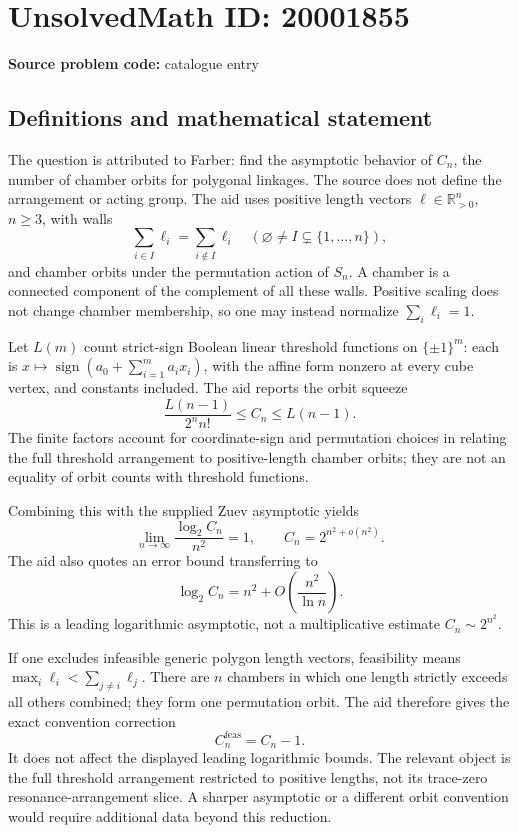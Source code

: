 \documentclass[11pt]{article}
\newcommand{\R}{\mathbb{R}}
\begin{document}
\section*{UnsolvedMath ID: 20001855}
\textbf{Source problem code:} catalogue entry
\subsection{Definitions and mathematical statement}
The question is attributed to Farber: find the asymptotic behavior of \(C_n\), the number of chamber orbits for polygonal linkages. The source does not define the arrangement or acting group. The aid uses positive length vectors \(\ell\in\R_{>0}^n\), \(n\geq3\), with walls
\[
 \sum_{i\in I}\ell_i=\sum_{i\notin I}\ell_i
 \quad(\varnothing\ne I\subsetneq\{1,\ldots,n\}),
\]
and chamber orbits under the permutation action of \(S_n\). A chamber is a connected component of the complement of all these walls. Positive scaling does not change chamber membership, so one may instead normalize \(\sum_i\ell_i=1\).

Let \(L(m)\) count strict-sign Boolean linear threshold functions on \(\{\pm1\}^m\): each is \(x\mapsto\operatorname{sign}(a_0+\sum_{i=1}^m a_ix_i)\), with the affine form nonzero at every cube vertex, and constants included. The aid reports the orbit squeeze
\[
 \frac{L(n-1)}{2^n n!}\leq C_n\leq L(n-1).
\]
The finite factors account for coordinate-sign and permutation choices in relating the full threshold arrangement to positive-length chamber orbits; they are not an equality of orbit counts with threshold functions.

Combining this with the supplied Zuev asymptotic yields
\[
 \lim_{n\to\infty}\frac{\log_2C_n}{n^2}=1,
 \qquad C_n=2^{n^2+o(n^2)}.
\]
The aid also quotes an error bound transferring to
\[
 \log_2C_n=n^2+O\left(\frac{n^2}{\ln n}\right).
\]
This is a leading logarithmic asymptotic, not a multiplicative estimate \(C_n\sim2^{n^2}\).

If one excludes infeasible generic polygon length vectors, feasibility means \(\max_i\ell_i<\sum_{j\ne i}\ell_j\). There are \(n\) chambers in which one length strictly exceeds all others combined; they form one permutation orbit. The aid therefore gives the exact convention correction
\[
 C_n^{\mathrm{feas}}=C_n-1.
\]
It does not affect the displayed leading logarithmic bounds. The relevant object is the full threshold arrangement restricted to positive lengths, not its trace-zero resonance-arrangement slice. A sharper asymptotic or a different orbit convention would require additional data beyond this reduction.
\end{document}
